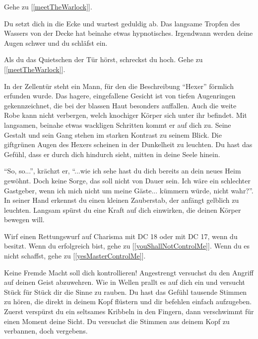 Gehe zu [\ref{meetTheWarlock}].


Du setzt dich in die Ecke und wartest geduldig ab. Das langsame Tropfen des Wassers von der Decke hat beinahe etwas hypnotisches. Irgendwann werden deine Augen schwer und du schläfst ein.

Als du das Quietschen der Tür hörst, schreckst du hoch. Gehe zu [\ref{meetTheWarlock}].


In der Zellentür steht ein Mann, für den die Beschreibung ``Hexer'' förmlich erfunden wurde. Das hagere, eingefallene Gesicht ist von tiefen Augenringen gekennzeichnet, die bei der blassen Haut besonders auffallen. Auch die weite Robe kann nicht verbergen, welch knochiger Körper sich unter ihr befindet. Mit langsamen, beinahe etwas wackligen Schritten kommt er auf dich zu. Seine Gestalt und sein Gang stehen im starken Kontrast zu seinem Blick. Die giftgrünen Augen des Hexers scheinen in der Dunkelheit zu leuchten. Du hast das Gefühl, dass er durch dich hindurch sieht, mitten in deine Seele hinein.

``So, so...'', krächzt er, ``...wie ich sehe hast du dich bereits an dein neues Heim gewöhnt. Doch keine Sorge, das soll nicht von Dauer sein. Ich wäre ein schlechter Gastgeber, wenn ich mich nicht um meine Gäste... kümmern würde, nicht wahr?''. In seiner Hand erkennst du einen kleinen Zauberstab, der anfängt gelblich zu leuchten. Langsam spürst du eine Kraft auf dich einwirken, die deinen Körper bewegen will.

Wirf einen Rettungswurf auf Charisma mit DC 18 oder mit DC 17, wenn du  besitzt. Wenn du erfolgreich bist, gehe zu [\ref{youShallNotControlMe}]. Wenn du es nicht schaffst, gehe zu [\ref{yesMasterControlMe}].


Keine Fremde Macht soll dich kontrollieren! Angestrengt versuchst du den Angriff auf deinen Geist abzuwehren. Wie in Wellen prallt es auf dich ein und versucht Stück für Stück dir die Sinne zu rauben. Du hast das Gefühl tausende Stimmen zu hören, die direkt in deinem Kopf flüstern und dir befehlen einfach aufzugeben. Zuerst verspürst du ein seltsames Kribbeln in den Fingern, dann verschwimmt für einen Moment deine Sicht. Du versuchst die Stimmen aus deinem Kopf zu verbannen, doch vergebens.

